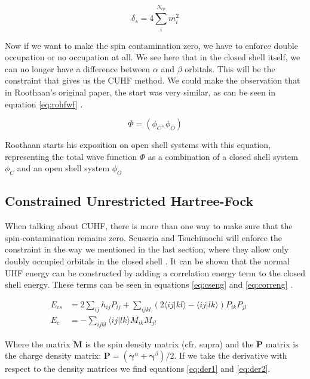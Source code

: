 \begin{equation}\label{eq:spincontfinal}
  \delta_s = 4\sum^{N_{cp}}_i m_i^2
\end{equation}

Now if we want to make the spin contamination zero, we have to enforce double occupation or no occupation at all. We see here that in
the closed shell itself, we can no longer have a difference between $\alpha$ and $\beta$ orbitals. This will be the constraint that gives us the CUHF method. We could make the observation
that in Roothaan's original paper, the start was very similar, as can be seen in equation \eqref{eq:rohfwf} \cite{Roothaan1960}.

\begin{equation}\label{eq:rohfwf}
  \Phi = (\phi_C,\phi_O)
\end{equation}

Roothaan starts his exposition on open shell systems with this equation, representing the total wave function $\Phi$ as a combination of a closed shell system $\phi_C$ and
an open shell system $\phi_O$

\subsection{Constrained Unrestricted Hartree-Fock}
\label{subsec:cuhftheory}
When talking about CUHF, there is more than one way to make sure that the spin-contamination remains zero. Scuseria and Tsuchimochi will enforce the constraint in the way
we mentioned in the last section, where they allow only doubly occupied orbitals in the closed shell \cite{Scuseria2010}. It can be shown that the normal UHF energy can be
constructed by adding a correlation energy term to the closed shell energy. These terms can be seen in equations \eqref{eq:cseng} and \eqref{eq:correng} \cite{Savin2010}.

\begin{subequations}
  \begin{align}
    \label{eq:cseng}
    E_{cs} & = 2\sum_{ij}h_{ij}P_{ij} + \sum_{ijkl}(2\langle ij|kl\rangle - \langle ij|lk \rangle)P_{ik}P_{jl} &  & \\
    \label{eq:correng}
    E_c    & = -\sum_{ijkl}\langle ij|lk \rangle M_{ik}M_{jl}                                                  &  &
  \end{align}
\end{subequations}

Where the matrix $\mathbf{M}$ is the spin density matrix (cfr. supra) and the $\mathbf{P}$ matrix is the charge density matrix: $\mathbf{P} = (\mathbf{\gamma}^\alpha + \mathbf{\gamma}^\beta)/2$. If we take the
derivative with respect to the density matrices we find equations \eqref{eq:der1} and \eqref{eq:der2}.


